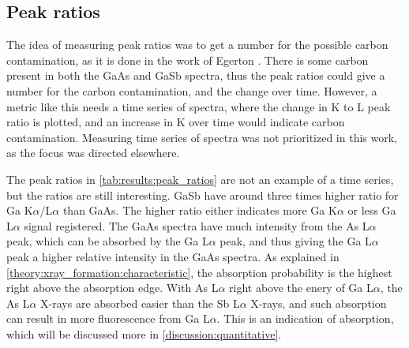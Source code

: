 \subsection{Peak ratios}
\label{discussion:peak_ratios}

The idea of measuring peak ratios was to get a number for the possible carbon contamination, as it is done in the work of Egerton \cite{egerton_nio_characterization_1994}.
There is some carbon present in both the GaAs and GaSb spectra, thus the peak ratios could give a number for the carbon contamination, and the change over time.
However, a metric like this needs a time series of spectra, where the change in K to L peak ratio is plotted, and an increase in K over time would indicate carbon contamination.
Measuring time series of spectra was not prioritized in this work, as the focus was directed elsewhere.

The peak ratios in \cref{tab:results:peak_ratios} are not an example of a time series, but the ratios are still interesting.
GaSb have around three times higher ratio for Ga K$\alpha$/L$\alpha$ than GaAs.
The higher ratio either indicates more Ga K$\alpha$ or less Ga L$\alpha$ signal registered.
The GaAs spectra have much intensity from the As L$\alpha$ peak, which can be absorbed by the Ga L$\alpha$ peak, and thus giving the Ga L$\alpha$ peak a higher relative intensity in the GaAs spectra.
As explained in \cref{theory:xray_formation:characteristic}, the absorption probability is the highest right above the absorption edge.
With As L$\alpha$ right above the enery of Ga L$\alpha$, the As L$\alpha$ X-rays are absorbed easier than the Sb L$\alpha$ X-rays, and such absorption can result in more fluorescence from Ga L$\alpha$.
This is an indication of absorption, which will be discussed more in \cref{discussion:quantitative}.




